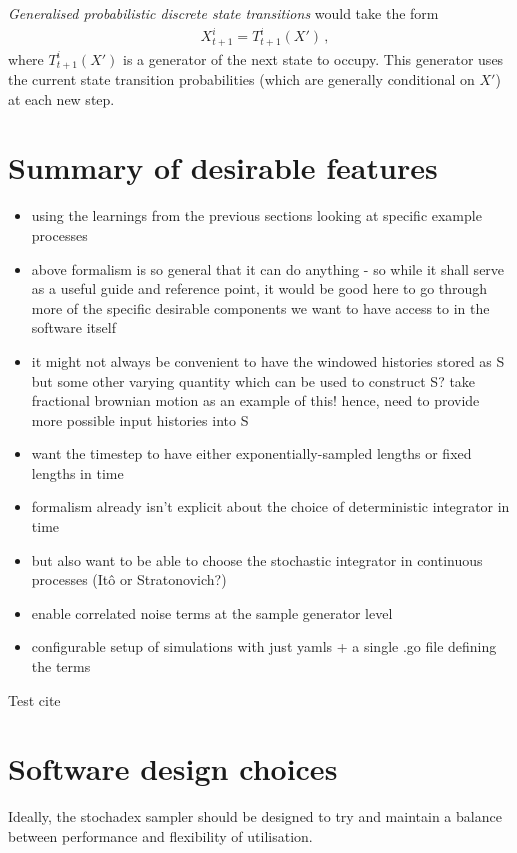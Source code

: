 \documentclass{book}
\begin{document}
\emph{Generalised probabilistic discrete state transitions} would take the form
\begin{align}
& X^i_{t+1} = T^i_{t+1}(X')\,,
\end{align}
where $T^i_{t+1}(X')$ is a generator of the next state to occupy. This generator uses the current state transition probabilities (which are generally conditional on $X'$) at each new step.

\section{\sffamily Summary of desirable features}

\begin{itemize}
\item{using the learnings from the previous sections looking at specific example processes}
\item{above formalism is so general that it can do anything - so while it shall serve as a useful guide and reference point, it would be good here to go through more of the specific desirable components we want to have access to in the software itself}
\item{it might not always be convenient to have the windowed histories stored as S but some other varying quantity which can be used to construct S? take fractional brownian motion as an example of this! hence, need to provide more possible input histories into S}
\item{want the timestep to have either exponentially-sampled lengths or fixed lengths in time}
\item{formalism already isn't explicit about the choice of deterministic integrator in time}
\item{but also want to be able to choose the stochastic integrator in continuous processes (Itô or Stratonovich?)}
\item{enable correlated noise terms at the sample generator level}
\item{configurable setup of simulations with just yamls + a single .go file defining the terms}
\end{itemize}


Test cite~\cite{Dimastrogiovanni:2018xnn}

\section{\sffamily Software design choices}

Ideally, the stochadex sampler should be designed to try and maintain a balance between performance and flexibility of utilisation.
\end{document}
